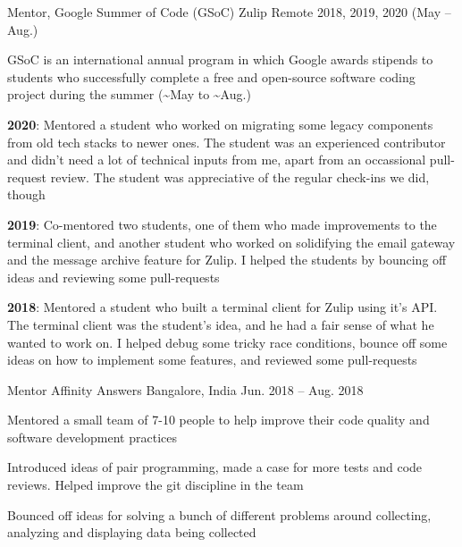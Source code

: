 
\begin{cventries}

  \cventry
      {Mentor, Google Summer of Code (GSoC)}
      {Zulip }
      {Remote} %
      {2018, 2019, 2020 (May -- Aug.)} %
      {
        \begin{cvitems} %
        \item {GSoC is an international annual program in which Google awards stipends to students who successfully complete a free and open-source software coding project during the summer (\textasciitilde May to \textasciitilde Aug.)}
        \item {\textbf{2020}: Mentored a student who worked on migrating some legacy components from old tech stacks to newer ones. The student was an experienced contributor and didn't need a lot of technical inputs from me, apart from an occassional pull-request review. The student was appreciative of the regular check-ins we did, though}
        \item {\textbf{2019}: Co-mentored two students, one of them who made improvements to the terminal client, and another student who worked on solidifying the email gateway and the message archive feature for Zulip. I helped the students by bouncing off ideas and reviewing some pull-requests}
        \item {\textbf{2018}: Mentored a student who built a terminal client for Zulip using it's API. The terminal client was the student's idea, and he had a fair sense of what he wanted to work on. I helped debug some tricky race conditions, bounce off some ideas on how to implement some features, and reviewed some pull-requests}
        \end{cvitems}
      }
  \cventry
      {Mentor}
      {Affinity Answers }
      {Bangalore, India} %
      {Jun. 2018 -- Aug. 2018} %
      {
        \begin{cvitems} %
        \item {Mentored a small team of 7-10 people to help improve their code quality and software development practices}
        \item {Introduced ideas of pair programming, made a case for more tests and code reviews. Helped improve the git discipline in the team}
        \item {Bounced off ideas for solving a bunch of different problems around collecting, analyzing and displaying data being collected}
        \end{cvitems}
      }
\end{cventries}

